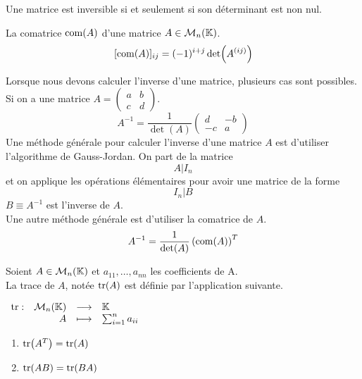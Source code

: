 \begin{proposition}
	Une matrice est inversible si et seulement si son déterminant est non nul.
\end{proposition}

\begin{definition}[Comatrice]
	La comatrice $\operatorname{com}(A)$ d'une matrice $A \in \mathcal{M}_n(\mathbb{K})$.
	$$
	[\operatorname{com}(A)]_{ij} = (-1)^{i + j} \det(A^{(ij)}) 
	$$
\end{definition}

Lorsque nous devons calculer l'inverse d'une matrice, plusieurs cas sont possibles.
    Si on a une matrice
    $A =
    \begin{pmatrix}
        a & b \\
        c & d
    \end{pmatrix}
    $.
    \[
    A^{-1} = \frac{1}{\det(A)} 
    \begin{pmatrix}
        d & -b \\
        -c & a
    \end{pmatrix}
    \]
    Une méthode générale pour calculer l'inverse d'une matrice $A$ est d'utiliser l'algorithme de Gauss-Jordan.
    On part de la matrice 
    \[ A|I_n \]
    et on applique les opérations élémentaires pour avoir une matrice de la forme
    \[I_n|B\]
    $B \equiv A^{-1}$ est l'inverse de $A$.
    \\
    Une autre méthode générale est d'utiliser la comatrice de $A$.
    \[ A^{-1} = \frac{1}{\det(A)} \left( \operatorname{com}(A) \right)^T \]

\begin{definition}
	Soient $A \in \mathcal{M}_n(\mathbb{K})$ et $a_{11}, \ldots, a_{nn}$ les coefficients de A. 
	\\
	La trace de $A$, notée $\tr(A)$ est définie par l'application suivante.
	\begin{center}
		$
		\begin{array}{rrcl} \tr : & \mathcal{M}_n(\mathbb{K}) & \longrightarrow & \mathbb{K} \\ & A & \longmapsto & \sum_{i=1}^n a_{ii} \end{array}
		$
	\end{center}
\end{definition}

\begin{lemma}
	\begin{multicols}{2}
	    \begin{enumerate}
    		\item $\tr(A^T) = \tr(A)$
    		\item $\tr(A B) = \tr(B A)$
    	\end{enumerate}
	\end{multicols}
\end{lemma}

